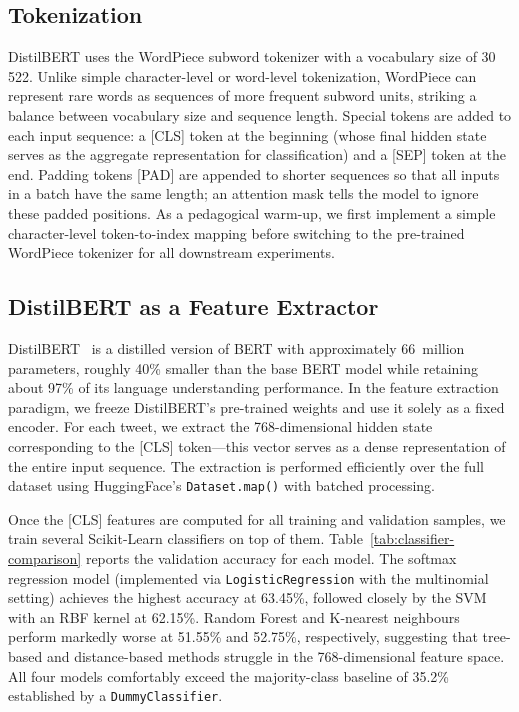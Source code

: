 \documentclass{article}
\begin{document}
\subsection{Tokenization}\label{subsec:tokenization}

DistilBERT uses the WordPiece subword tokenizer with a vocabulary size
of 30\,522.  Unlike simple character-level or word-level tokenization,
WordPiece can represent rare words as sequences of more frequent subword
units, striking a balance between vocabulary size and sequence length.
Special tokens are added to each input sequence: a [CLS] token at the
beginning (whose final hidden state serves as the aggregate representation
for classification) and a [SEP] token at the end.  Padding tokens [PAD]
are appended to shorter sequences so that all inputs in a batch have the
same length; an attention mask tells the model to ignore these padded positions.
As a pedagogical warm-up, we first implement a simple character-level
token-to-index mapping before switching to the pre-trained WordPiece
tokenizer for all downstream experiments.


\subsection{DistilBERT as a Feature Extractor}\label{subsec:feature-extraction}

DistilBERT~\citep{sanh2019distilbert} is a distilled version of BERT with
approximately 66~million parameters, roughly 40\% smaller than the base
BERT model while retaining about 97\% of its language understanding
performance.  In the feature extraction paradigm, we freeze DistilBERT's
pre-trained weights and use it solely as a fixed encoder.  For each tweet,
we extract the 768-dimensional hidden state corresponding to the [CLS]
token---this vector serves as a dense representation of the entire input
sequence.  The extraction is performed efficiently over the full dataset
using HuggingFace's \texttt{Dataset.map()} with batched processing.

Once the [CLS] features are computed for all training and validation
samples, we train several Scikit-Learn classifiers on top of them.
Table~\ref{tab:classifier-comparison} reports the validation accuracy
for each model.  The softmax regression model (implemented via
\texttt{LogisticRegression} with the multinomial setting) achieves the
highest accuracy at 63.45\%, followed closely by the SVM with an RBF
kernel at 62.15\%.  Random Forest and K-nearest neighbours perform
markedly worse at 51.55\% and 52.75\%, respectively, suggesting that
tree-based and distance-based methods struggle in the 768-dimensional
feature space.  All four models comfortably exceed the majority-class
baseline of 35.2\% established by a \texttt{DummyClassifier}.
\end{document}
